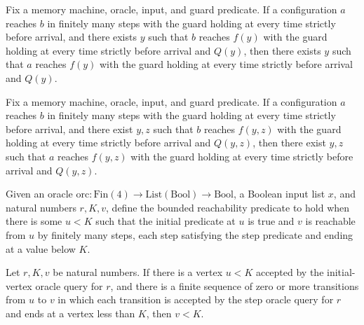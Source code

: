 \begin{lemma}
\label{Complexity.LogProg.ExpBFS.ex1_pre}
\leanok
{}
Fix a memory machine, oracle, input, and guard predicate. If a configuration $a$ reaches
$b$ in finitely many steps with the guard holding at every time strictly before arrival,
and there exists $y$ such that $b$ reaches $f(y)$ with the guard holding at every time
strictly before arrival and $Q(y)$, then there exists $y$ such that $a$ reaches $f(y)$
with the guard holding at every time strictly before arrival and $Q(y)$.
\end{lemma}

\begin{lemma}
\label{Complexity.LogProg.ExpBFS.ex2_pre}
\leanok
{}
Fix a memory machine, oracle, input, and guard predicate. If a configuration $a$ reaches
$b$ in finitely many steps with the guard holding at every time strictly before arrival,
and there exist $y,z$ such that $b$ reaches $f(y,z)$ with the guard holding at every
time strictly before arrival and $Q(y,z)$, then there exist $y,z$ such that $a$ reaches
$f(y,z)$ with the guard holding at every time strictly before arrival and $Q(y,z)$.
\end{lemma}

\begin{definition}
\label{Complexity.LogProg.ExpBFS.Cl}
\leanok
{}
Given an oracle
$\mathrm{orc}:\mathrm{Fin}(4)\to\mathrm{List}(\mathrm{Bool})\to\mathrm{Bool}$, a Boolean
input list $x$, and natural numbers $r,K,v$, define the bounded reachability predicate
to hold when there is some $u<K$ such that the initial predicate at $u$ is true and $v$
is reachable from $u$ by finitely many steps, each step satisfying the step predicate
and ending at a value below $K$.
\end{definition}

\begin{lemma}
\label{Complexity.LogProg.ExpBFS.Cl.lt}
\leanok
{}
Let $r,K,v$ be natural numbers. If there is a vertex $u<K$ accepted by the
initial-vertex oracle query for $r$, and there is a finite sequence of zero or more
transitions from $u$ to $v$ in which each transition is accepted by the step oracle
query for $r$ and ends at a vertex less than $K$, then $v<K$.
\end{lemma}

